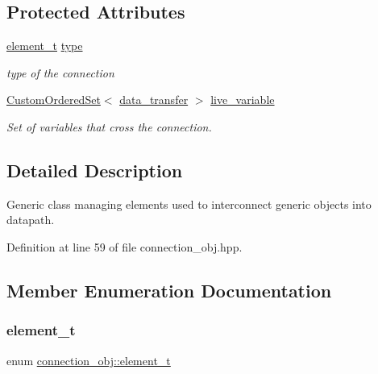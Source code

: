 \subsection*{Protected Attributes}
\begin{DoxyCompactItemize}
\item 
\hyperlink{classconnection__obj_a28fc8ddc2893b5ef328f75147a18f6c6}{element\+\_\+t} \hyperlink{classconnection__obj_ae57fba79883abb4819649e19e4a465cc}{type}
\begin{DoxyCompactList}\small\item\em type of the connection \end{DoxyCompactList}\item 
\hyperlink{classCustomOrderedSet}{Custom\+Ordered\+Set}$<$ \hyperlink{conn__binding_8hpp_ae44ffa64566f2bb3ce6941833ac940fb}{data\+\_\+transfer} $>$ \hyperlink{classconnection__obj_a8aaa77e1cdcf09d010e0f1f712e3fc21}{live\+\_\+variable}
\begin{DoxyCompactList}\small\item\em Set of variables that cross the connection. \end{DoxyCompactList}\end{DoxyCompactItemize}


\subsection{Detailed Description}
Generic class managing elements used to interconnect generic objects into datapath. 

Definition at line 59 of file connection\+\_\+obj.\+hpp.



\subsection{Member Enumeration Documentation}
\mbox{\label{classconnection__obj_a28fc8ddc2893b5ef328f75147a18f6c6}} 
\subsubsection{\texorpdfstring{element\+\_\+t}{element\_t}}
{\footnotesize\ttfamily enum \hyperlink{classconnection__obj_a28fc8ddc2893b5ef328f75147a18f6c6}{connection\+\_\+obj\+::element\+\_\+t}}



